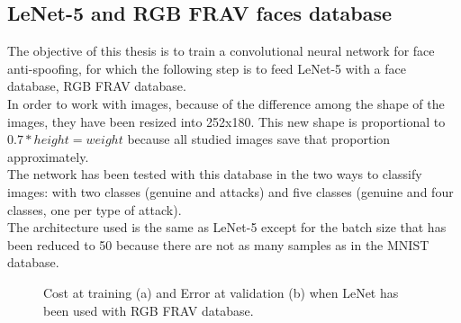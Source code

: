 \subsection{LeNet-5 and RGB FRAV faces database} \label{Lenet-FRAV}
The objective of this thesis is to train a convolutional neural network for face anti-spoofing, for which the following step is to feed LeNet-5 with a face database, RGB FRAV database.\\

In order to work with images, because of the difference among the shape of the images, they have been resized into 252x180. This new shape is proportional to $0.7*height = weight$ because all studied images save that proportion approximately.\\

The network has been tested with this database in the two ways to classify images: with two classes (genuine and attacks) and five classes (genuine and four classes, one per type of attack).\\

The architecture used is the same as LeNet-5 except for the batch size that has been reduced to 50 because there are not as many samples as in the MNIST database.\\

\begin{figure}[tb]
\centering
{}
\caption{Cost at training (a) and Error at validation (b) when LeNet has been used with RGB FRAV database.}
\label{fig:Lenet_FRAV}
\end{figure}

